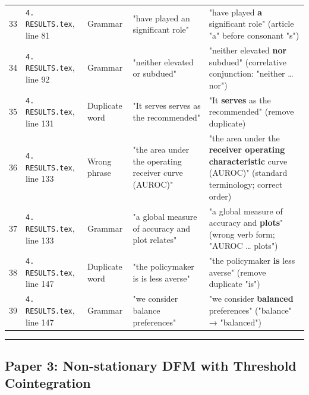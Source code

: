 \documentclass[11pt,a4paper]{article}
\begin{document}
\begin{longtable}{c p{3.2cm} l p{3.8cm} p{3.5cm}}
33 & \texttt{4. RESULTS.tex}, line 81 & Grammar & "have played an significant role" & "have played \textbf{a} significant role" (article "a" before consonant "s") \\
34 & \texttt{4. RESULTS.tex}, line 92 & Grammar & "neither elevated or subdued" & "neither elevated \textbf{nor} subdued" (correlative conjunction: "neither … nor") \\
35 & \texttt{4. RESULTS.tex}, line 131 & Duplicate word & "It serves serves as the recommended" & "It \textbf{serves} as the recommended" (remove duplicate) \\
36 & \texttt{4. RESULTS.tex}, line 133 & Wrong phrase & "the area under the operating receiver curve (AUROC)" & "the area under the \textbf{receiver operating characteristic} curve (AUROC)" (standard terminology; correct order) \\
37 & \texttt{4. RESULTS.tex}, line 133 & Grammar & "a global measure of accuracy and plot relates" & "a global measure of accuracy and \textbf{plots}" (wrong verb form; "AUROC … plots") \\
38 & \texttt{4. RESULTS.tex}, line 147 & Duplicate word & "the policymaker is is less averse" & "the policymaker \textbf{is} less averse" (remove duplicate "is") \\
39 & \texttt{4. RESULTS.tex}, line 147 & Grammar & "we consider balance preferences" & "we consider \textbf{balanced} preferences" ("balance" → "balanced") \\
\bottomrule
\end{longtable}


\medskip\hrule\medskip

\subsection*{Paper 3: Non-stationary DFM with Threshold Cointegration}
\end{document}
